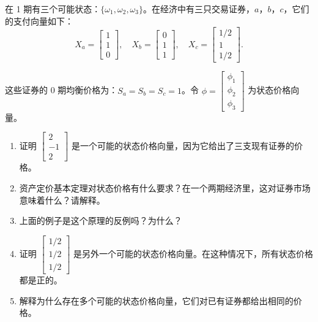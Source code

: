 \begin{problem}
 在 1 期有三个可能状态：$\{\omega_{1},\omega_{2},\omega_{3}\}$。在经济中有三只交易证券，$a$，$b$，$c$，它们的支付向量如下：
\[
    X_{a}=\begin{bmatrix}1\\1\\0\end{bmatrix},\quad
    X_{b}=\begin{bmatrix}0\\1\\1\end{bmatrix},\quad
    X_{c}=\begin{bmatrix}1/2\\1\\1/2\end{bmatrix}.
\]

这些证券的 0 期均衡价格为：$S_{a}=S_{b}=S_{c}=1$。令 $\phi=\begin{bmatrix}\phi_{1} \\ \phi_{2} \\ \phi_{3}\end{bmatrix}$ 为状态价格向量。
\begin{enumerate}[label=(\alph*)]
    \item 证明 $\begin{bmatrix}2 \\ -1 \\ 2\end{bmatrix}$ 是一个可能的状态价格向量，因为它给出了三支现有证券的价格。
    \item 资产定价基本定理对状态价格有什么要求？在一个两期经济里，这对证券市场意味着什么？请解释。
    \item 上面的例子是这个原理的反例吗？为什么？
    \item 证明 $\begin{bmatrix}1/2 \\ 1/2 \\ 1/2\end{bmatrix}$ 是另外一个可能的状态价格向量。在这种情况下，所有状态价格都是正的。
    \item 解释为什么存在多个可能的状态价格向量，它们对已有证券都给出相同的价格。
\end{enumerate}
\end{problem}
